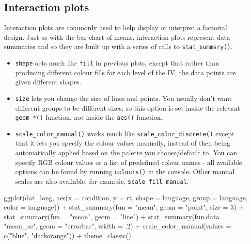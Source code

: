 \documentclass[
  english,
  doc,floatsintext]{apa6}
\newenvironment{Shaded}{\begin{snugshade}}{\end{snugshade}}
\newcommand{\AttributeTok}[1]{\textcolor[rgb]{0.77,0.63,0.00}{#1}}
\newcommand{\DecValTok}[1]{\textcolor[rgb]{0.00,0.00,0.81}{#1}}
\newcommand{\FunctionTok}[1]{\textcolor[rgb]{0.00,0.00,0.00}{#1}}
\newcommand{\NormalTok}[1]{#1}
\newcommand{\SpecialCharTok}[1]{\textcolor[rgb]{0.00,0.00,0.00}{#1}}
\newcommand{\StringTok}[1]{\textcolor[rgb]{0.31,0.60,0.02}{#1}}
\begin{document}
\hypertarget{interaction-plots}{%
\subsection{Interaction plots}\label{interaction-plots}}

Interaction plots are commonly used to help display or interpret a factorial design. Just as with the bar chart of means, interaction plots represent data summaries and so they are built up with a series of calls to \texttt{stat\_summary()}.

\begin{itemize}
\item
  \texttt{shape} acts much like \texttt{fill} in previous plots, except that rather than producing different colour fills for each level of the IV, the data points are given different shapes.
\item
  \texttt{size} lets you change the size of lines and points. You usually don't want different groups to be different sizes, so this option is set inside the relevant \texttt{geom\_*()} function, not inside the \texttt{aes()} function.
\item
  \texttt{scale\_color\_manual()} works much like \texttt{scale\_color\_discrete()} except that it lets you specify the colour values manually, instead of then being automatically applied based on the palette you choose/default to. You can specify RGB colour values or a list of predefined colour names - all available options can be found by running \texttt{colours()} in the console. Other manual scales are also available, for example, \texttt{scale\_fill\_manual}.
\end{itemize}

\begin{Shaded}
\begin{Highlighting}[]
\FunctionTok{ggplot}\NormalTok{(dat\_long, }\FunctionTok{aes}\NormalTok{(}\AttributeTok{x =}\NormalTok{ condition, }\AttributeTok{y =}\NormalTok{ rt, }
                     \AttributeTok{shape =}\NormalTok{ language,}
                     \AttributeTok{group =}\NormalTok{ language,}
                     \AttributeTok{color =}\NormalTok{ language)) }\SpecialCharTok{+}
  \FunctionTok{stat\_summary}\NormalTok{(}\AttributeTok{fun =} \StringTok{"mean"}\NormalTok{, }\AttributeTok{geom =} \StringTok{"point"}\NormalTok{, }\AttributeTok{size =} \DecValTok{3}\NormalTok{) }\SpecialCharTok{+}
  \FunctionTok{stat\_summary}\NormalTok{(}\AttributeTok{fun =} \StringTok{"mean"}\NormalTok{, }\AttributeTok{geom =} \StringTok{"line"}\NormalTok{) }\SpecialCharTok{+}
  \FunctionTok{stat\_summary}\NormalTok{(}\AttributeTok{fun.data =} \StringTok{"mean\_se"}\NormalTok{, }\AttributeTok{geom =} \StringTok{"errorbar"}\NormalTok{, }\AttributeTok{width =}\NormalTok{ .}\DecValTok{2}\NormalTok{) }\SpecialCharTok{+}
  \FunctionTok{scale\_color\_manual}\NormalTok{(}\AttributeTok{values =} \FunctionTok{c}\NormalTok{(}\StringTok{"blue"}\NormalTok{, }\StringTok{"darkorange"}\NormalTok{)) }\SpecialCharTok{+}
  \FunctionTok{theme\_classic}\NormalTok{()}
\end{Highlighting}
\end{Shaded}
\end{document}

